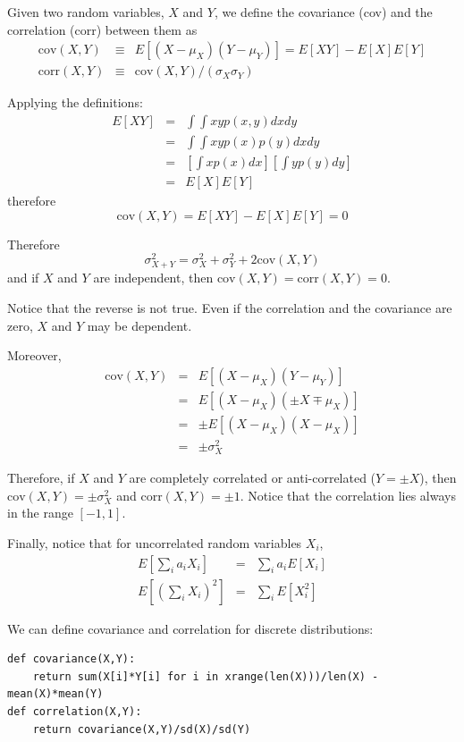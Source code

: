 \documentclass[justified,sixbynine]{tufte-book}
\def\ft{\small\tt}
\theoremstyle{plain}%
\theoremstyle{definition}
\theoremstyle{remark}
\begin{document}
\begin{fullwidth}
Given two random variables, $X$ and $Y$, we define the covariance (cov)  and the correlation (corr)
between
them as
\begin{eqnarray}
\textrm{cov}(X,Y) &\equiv  &E[(X-\mu _X)(Y-\mu _Y)]=E[XY]-E[X]E[Y] \\
\textrm{corr}(X,Y) &\equiv & \textrm{cov}(X,Y)/(\sigma_X \sigma_Y)
\end{eqnarray}

Applying the definitions:
\begin{eqnarray}
E[XY] &=&\int \int xyp(x,y)dxdy \\
&=&\int \int xyp(x)p(y)dxdy \\
&=&\left[ \int xp(x)dx\right] \left[ \int yp(y)dy\right] \\
&=&E[X]E[Y]
\end{eqnarray}
therefore
\begin{equation}
\textrm{cov}(X,Y) =E[XY]-E[X]E[Y]=0
\end{equation}

Therefore
\begin{equation}
\sigma _{X+Y}^2=\sigma _X^2+\sigma _Y^2+2 \textrm{cov}(X,Y)
\end{equation}
and if $X$ and $Y$ are independent, then $\textrm{cov}(X,Y)=\textrm{corr}(X,Y)=0$.

Notice that the reverse is not true. Even if the correlation and the covariance are zero, $X$ and $Y$ may be dependent.

Moreover,
\begin{eqnarray}
\textrm{cov}(X,Y) &=&E[(X-\mu _X)(Y-\mu _Y)] \\
&=&E[(X-\mu _X)(\pm X\mp \mu _X)] \\
&=&\pm E[(X-\mu _X)(X-\mu _X)] \\
&=&\pm \sigma _X^2
\end{eqnarray}

Therefore, if $X$ and $Y$ are completely correlated or anti-correlated ($Y=\pm X$), then $\textrm{cov}(X,Y)=\pm \sigma _X^2$ and $\textrm{corr}(X,Y) = \pm 1$.
Notice that the correlation lies always in the range $[-1,1]$.

Finally, notice that for uncorrelated random variables $X_i$,
\begin{eqnarray}
E[\sum_ia_iX_i] &=&\sum_ia_iE[X_i] \\
E[(\sum_iX_i)^2] &=&\sum_iE[X_i^2]
\end{eqnarray}


We can define covariance and correlation for discrete distributions:
\begin{lstlisting}[caption={in file: {\ft nlib.py}}]
def covariance(X,Y):
    return sum(X[i]*Y[i] for i in xrange(len(X)))/len(X) - mean(X)*mean(Y)
def correlation(X,Y):
    return covariance(X,Y)/sd(X)/sd(Y)
\end{lstlisting}


\end{fullwidth}
\end{document}
